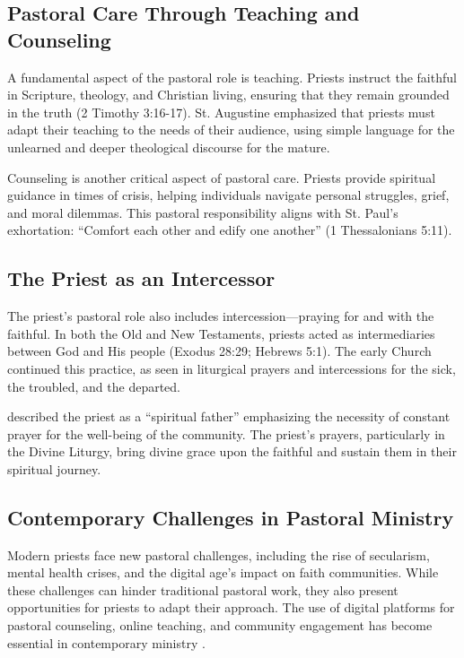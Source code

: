 \documentclass[12pt, doc]{apa7}   	%
\begin{document}
\subsection{Pastoral Care Through Teaching and Counseling}

A fundamental aspect of the pastoral role is teaching. Priests instruct the faithful in Scripture, theology, and Christian living, ensuring that they remain grounded in the truth (2 Timothy 3:16-17). St. Augustine \citep{early_church_akin} emphasized that priests must adapt their teaching to the needs of their audience, using simple language for the unlearned and deeper theological discourse for the mature.

Counseling is another critical aspect of pastoral care. Priests provide spiritual guidance in times of crisis, helping individuals navigate personal struggles, grief, and moral dilemmas. This pastoral responsibility aligns with St. Paul’s exhortation: ``Comfort each other and edify one another'' (1 Thessalonians 5:11).

\subsection{The Priest as an Intercessor}

The priest’s pastoral role also includes intercession—praying for and with the faithful. In both the Old and New Testaments, priests acted as intermediaries between God and His people (Exodus 28:29; Hebrews 5:1). The early Church continued this practice, as seen in liturgical prayers and intercessions for the sick, the troubled, and the departed.

\citet{priests_zacharias} described the priest as a ``spiritual father'' emphasizing the necessity of constant prayer for the well-being of the community. The priest’s prayers, particularly in the Divine Liturgy, bring divine grace upon the faithful and sustain them in their spiritual journey.

\subsection{Contemporary Challenges in Pastoral Ministry}

Modern priests face new pastoral challenges, including the rise of secularism, mental health crises, and the digital age’s impact on faith communities. While these challenges can hinder traditional pastoral work, they also present opportunities for priests to adapt their approach. The use of digital platforms for pastoral counseling, online teaching, and community engagement has become essential in contemporary ministry \citep{orthodox_church_ware}. 
\end{document}
